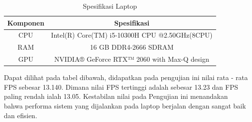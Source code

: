 \begin{longtable}{|c|c|}
  \caption{Spesifikasi Laptop}
  \label{tb:Spesifikasi Laptop}                                   \\
  \hline
  \rowcolor[HTML]{C0C0C0}
  \textbf{Komponen} & \textbf{Spesifikasi}  \\
  \hline
  CPU            & Intel(R) Core(TM) i5-10300H CPU @2.50GHz(8CPU)        \\
  RAM            & 16 GB DDR4-2666 SDRAM        \\
  GPU            & NVIDIA® GeForce RTX™ 2060 with Max-Q design           \\
  \hline
\end{longtable}
Dapat dilihat pada tabel dibawah, didapatkan pada pengujian ini nilai rata - rata FPS sebesar 13.140. Dimana nilai FPS tertinggi adalah sebesar 13.23 dan FPS paling rendah ialah 13.05. Kestabilan nilai pada Pengujian ini menandakan bahwa performa sistem yang dijalankan pada laptop berjalan dengan sangat baik dan efisien.
